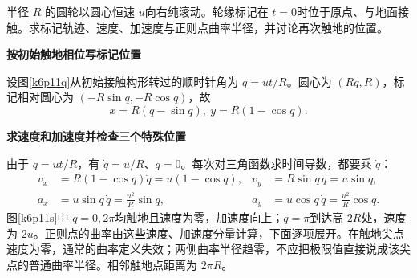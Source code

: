 \begin{question}\begin{example}[摆线的速度与加速度]\label{k6p11}
半径 $R$ 的圆轮以圆心恒速 $u$向右纯滚动。轮缘标记在 $t=0$时位于原点、与地面接触。求标记轨迹、速度、加速度与正则点曲率半径，并讨论再次触地的位置。\end{example}
\end{question}
\begin{solution}\textbf{按初始触地相位写标记位置}\par\nobreak
设图\ref{k6p11q}从初始接触构形转过的顺时针角为 $q=ut/R$。圆心为 $(Rq,R)$，标记相对圆心为 $(-R\sin q,-R\cos q)$，故
\[\boxed{x=R(q-\sin q),\ y=R(1-\cos q)}.\]



\par\medskip{}\noindent\textbf{求速度和加速度并检查三个特殊位置}\par\nobreak
由于 $q=ut/R$，有 $\dot q=u/R$、$\ddot q=0$。每次对三角函数求时间导数，都要乘 $\dot q$：
\begin{align*}
v_x&=R(1-\cos q)\dot q=u(1-\cos q),&
v_y&=R\sin q\,\dot q=u\sin q,\\
a_x&=u\sin q\,\dot q=\frac{u^2}{R}\sin q,&
a_y&=u\cos q\,\dot q=\frac{u^2}{R}\cos q.
\end{align*}
图\ref{k6p11s}中 $q=0,2\pi$均触地且速度为零，加速度向上；$q=\pi$到达高 $2R$处，速度为 $2u$。正则点的曲率由这些速度、加速度分量计算，下面逐项展开。在触地尖点速度为零，通常的曲率定义失效；两侧曲率半径趋零，不应把极限值直接说成该尖点的普通曲率半径。相邻触地点距离为 $2\pi R$。




\end{solution}
